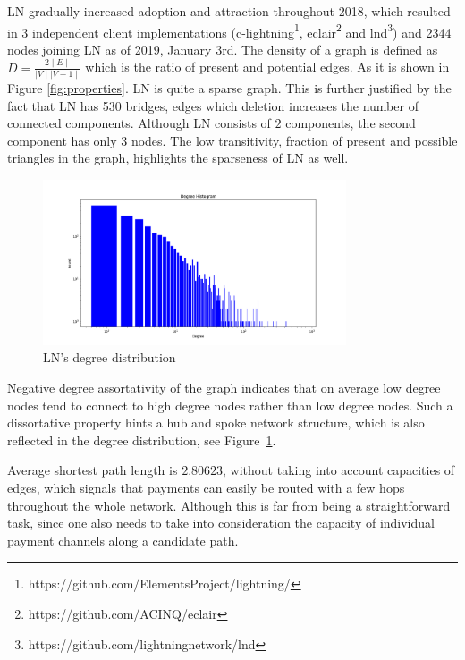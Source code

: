 \documentclass[runningheads]{llncs}
\begin{document}
LN gradually increased adoption and attraction throughout 2018, which resulted in 3 independent client implementations (c-lightning\footnote{https://github.com/ElementsProject/lightning/}, eclair\footnote{https://github.com/ACINQ/eclair} and lnd\footnote{https://github.com/lightningnetwork/lnd}) and \num[group-separator={,}]{2344} nodes joining LN as of 2019, January 3rd. The density of a graph is defined as $D=\frac{2\mid E\mid}{\mid V\mid \mid V-1\mid}$  which is the ratio of present and potential edges. As it is shown in Figure \ref{fig:properties}. LN is quite a sparse graph. This is further justified by the fact that LN has \num[group-separator={,}]{530} bridges, edges which deletion increases the number of connected components. Although LN consists of $2$ components, the second component has only $3$ nodes. The low transitivity, fraction of present and possible triangles in the graph, highlights the sparseness of LN as well.

\begin{figure}	
		\includegraphics[width=0.8\textwidth]{degreehistogramloglogscale.png}
	\caption{LN's degree distribution}\label{fig:degreedist}	
\end{figure}

Negative degree assortativity of the graph indicates that on average low degree nodes tend to connect to high degree nodes rather than low degree nodes. Such a dissortative property hints a hub and spoke network structure, which is also reflected in the degree distribution, see Figure~\ref{fig:degreedist}.

Average shortest path length is $2.80623$, without taking into account capacities of edges, which signals that payments can easily be routed with a few hops throughout the whole network. Although this is far from being a straightforward task, since one also needs to take into consideration the capacity of individual payment channels along a candidate path.
\end{document}
